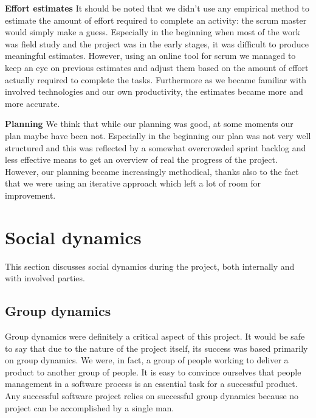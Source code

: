 \textbf{Effort estimates}\newline
It should be noted that we didn't use any empirical method to estimate the amount of effort
required to complete an activity: the scrum master would simply make a guess.
Especially in the beginning when most of the work was field study and the project
was in the early stages, it was difficult to produce meaningful estimates.
However, using an online tool for scrum we managed to keep an eye on previous
estimates and adjust them based on the amount of effort actually required to complete the tasks.
Furthermore as we became familiar with involved technologies and our own productivity,
the estimates became more and more accurate.

\textbf{Planning}\newline
We think that while our planning was good, at some moments our plan maybe have been not.
Especially in the beginning our plan was not very well structured and this was reflected
by a somewhat overcrowded sprint backlog and less effective means to get an overview
of real the progress of the project. However, our planning became increasingly
methodical, thanks also to the fact that we were using an iterative approach which
left a lot of room for improvement.%

\section{Social dynamics}
This section discusses social dynamics during the project, both internally and with
involved parties.

\subsection{Group dynamics}
\label{sec:group}

Group dynamics were definitely a critical aspect of this project.
It would be safe to say that due to the nature of the project itself, its success was based primarily on group dynamics.
We were, in fact, a group of people working to deliver a product to another group of people.
It is easy to convince ourselves that people management in a software process is an essential task for a successful product.
Any successful software project relies on successful group dynamics because no project can be
accomplished by a single man.%

